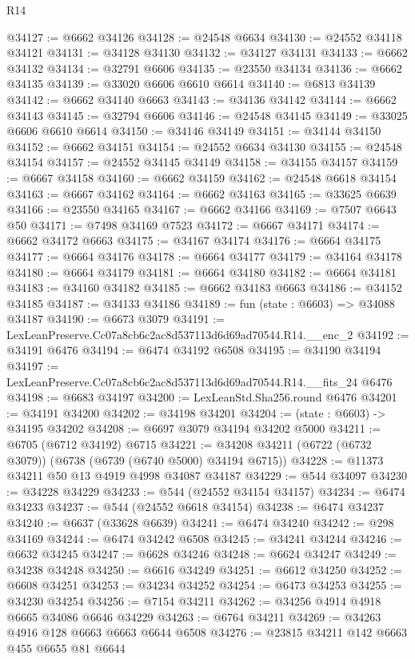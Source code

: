 \begin{lexlean}{R14}
\begin{coremodule}
@34127 := @6662 @34126
@34128 := @24548 @6634
@34130 := @24552 @34118 @34121
@34131 := @34128 @34130
@34132 := @34127 @34131
@34133 := @6662 @34132
@34134 := @32791 @6606
@34135 := @23550 @34134
@34136 := @6662 @34135
@34139 := @33020 @6606 @6610 @6614
@34140 := @6813 @34139
@34142 := @6662 @34140 @6663
@34143 := @34136 @34142
@34144 := @6662 @34143
@34145 := @32794 @6606
@34146 := @24548 @34145
@34149 := @33025 @6606 @6610 @6614
@34150 := @34146 @34149
@34151 := @34144 @34150
@34152 := @6662 @34151
@34154 := @24552 @6634 @34130
@34155 := @24548 @34154
@34157 := @24552 @34145 @34149
@34158 := @34155 @34157
@34159 := @6667 @34158
@34160 := @6662 @34159
@34162 := @24548 @6618 @34154
@34163 := @6667 @34162
@34164 := @6662 @34163
@34165 := @33625 @6639
@34166 := @23550 @34165
@34167 := @6662 @34166
@34169 := @7507 @6643 @50
@34171 := @7498 @34169 @7523
@34172 := @6667 @34171
@34174 := @6662 @34172 @6663
@34175 := @34167 @34174
@34176 := @6664 @34175
@34177 := @6664 @34176
@34178 := @6664 @34177
@34179 := @34164 @34178
@34180 := @6664 @34179
@34181 := @6664 @34180
@34182 := @6664 @34181
@34183 := @34160 @34182
@34185 := @6662 @34183 @6663
@34186 := @34152 @34185
@34187 := @34133 @34186
@34189 := fun (state : @6603) => @34088 @34187
@34190 := @6673 @3079
@34191 := LexLeanPreserve.Cc07a8cb6c2ac8d537113d6d69ad70544.R14.__enc_2
@34192 := @34191 @6476
@34194 := @6474 @34192 @6508
@34195 := @34190 @34194
@34197 := LexLeanPreserve.Cc07a8cb6c2ac8d537113d6d69ad70544.R14.__fits_24 @6476
@34198 := @6683 @34197
@34200 := LexLeanStd.Sha256.round @6476
@34201 := @34191 @34200
@34202 := @34198 @34201
@34204 := (state : @6603) -> @34195 @34202
@34208 := @6697 @3079 @34194 @34202 @5000
@34211 := @6705 (@6712 @34192) @6715
@34221 := @34208 @34211 (@6722 (@6732 @3079)) (@6738 (@6739 (@6740 @5000) @34194 @6715))
@34228 := @11373 @34211 @50 @13 @4919 @4998 @34087 @34187
@34229 := @544 @34097
@34230 := @34228 @34229
@34233 := @544 (@24552 @34154 @34157)
@34234 := @6474 @34233
@34237 := @544 (@24552 @6618 @34154)
@34238 := @6474 @34237
@34240 := @6637 (@33628 @6639)
@34241 := @6474 @34240
@34242 := @298 @34169
@34244 := @6474 @34242 @6508
@34245 := @34241 @34244
@34246 := @6632 @34245
@34247 := @6628 @34246
@34248 := @6624 @34247
@34249 := @34238 @34248
@34250 := @6616 @34249
@34251 := @6612 @34250
@34252 := @6608 @34251
@34253 := @34234 @34252
@34254 := @6473 @34253
@34255 := @34230 @34254
@34256 := @7154 @34211
@34262 := @34256 @4914 @4918 @6665 @34086 @6646 @34229
@34263 := @6764 @34211
@34269 := @34263 @4916 @128 @6663 @6663 @6644 @6508
@34276 := @23815 @34211 @142 @6663 @455 @6655 @81 @6644

\end{coremodule}
\end{lexlean}
